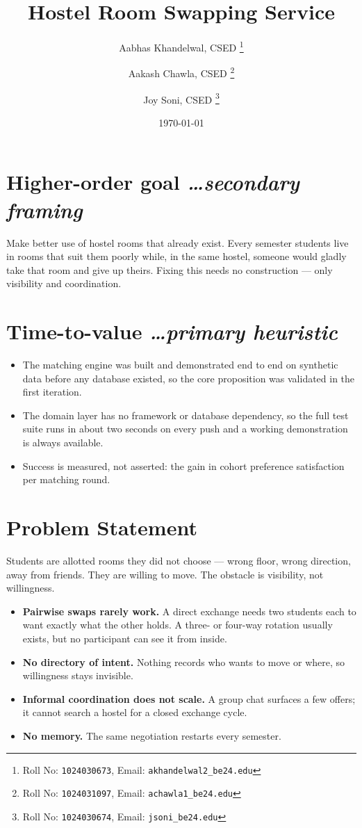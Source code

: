 \documentclass[11pt,a4paper]{article}
\title{Hostel Room Swapping Service}
\author{
  Aabhas Khandelwal, CSED%
  \thanks{Roll No: \texttt{1024030673}, %
    Email: \texttt{akhandelwal2\_be24\@thapar.edu}}
  \and
  Aakash Chawla, CSED%
  \thanks{Roll No: \texttt{1024031097}, %
    Email: \texttt{achawla1\_be24\@thapar.edu}}
  \and
  Joy Soni, CSED%
  \thanks{Roll No: \texttt{1024030674}, %
    Email: \texttt{jsoni\_be24\@thapar.edu}}
}
\date{\today}
\newcommand{\BvrHint}[1]{%
  {\normalfont\normalsize\itshape\hfill #1}}
\begin{document}
\maketitle

\section{Higher-order goal%
  \BvrHint{\ldots secondary framing}}
Make better use of hostel rooms that already exist.
Every semester students live in rooms that suit them
poorly while, in the same hostel, someone would gladly
take that room and give up theirs. Fixing this needs no
construction --- only visibility and coordination.

\section{Time-to-value %
\BvrHint{\ldots primary heuristic}}
\begin{itemize}[leftmargin=0.7cm]
    \item The matching engine was built and demonstrated
      end to end on synthetic data before any database
      existed, so the core proposition was validated in
      the first iteration.
    \item The domain layer has no framework or database
      dependency, so the full test suite runs in about
      two seconds on every push and a working
      demonstration is always available.
    \item Success is measured, not asserted: the gain in
      cohort preference satisfaction per matching round.
\end{itemize}

\section{Problem Statement}
Students are allotted rooms they did not choose --- wrong
floor, wrong direction, away from friends. They are
willing to move. The obstacle is visibility, not
willingness.
\begin{itemize}[leftmargin=0.7cm]
    \item \textbf{Pairwise swaps rarely work.} A direct
      exchange needs two students each to want exactly
      what the other holds. A three- or four-way
      rotation usually exists, but no participant can
      see it from inside.
    \item \textbf{No directory of intent.} Nothing
      records who wants to move or where, so willingness
      stays invisible.
    \item \textbf{Informal coordination does not scale.}
      A group chat surfaces a few offers; it cannot
      search a hostel for a closed exchange cycle.
    \item \textbf{No memory.} The same negotiation
      restarts every semester.
\end{itemize}
\end{document}
